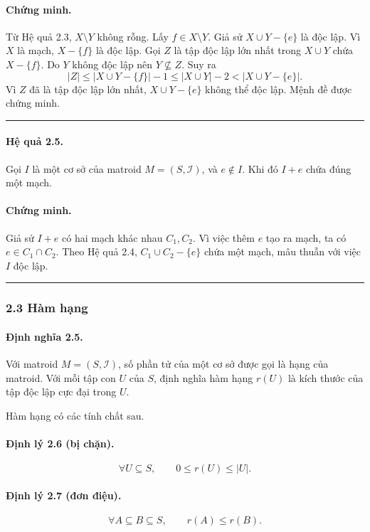 \documentclass[11pt]{article}
\newcommand{\qedmark}{\hfill\rule{0.7ex}{0.7ex}}
\begin{document}
\paragraph{Chứng minh.}
Từ Hệ quả 2.3, \(X\setminus Y\) không rỗng. Lấy \(f\in X\setminus Y\). Giả sử
\(X\cup Y-\{e\}\) là độc lập. Vì \(X\) là mạch, \(X-\{f\}\) là độc lập. Gọi
\(Z\) là tập độc lập lớn nhất trong \(X\cup Y\) chứa \(X-\{f\}\). Do \(Y\) không
độc lập nên \(Y\not\subseteq Z\). Suy ra
\[
  |Z|\le |X\cup Y-\{f\}|-1\le |X\cup Y|-2<|X\cup Y-\{e\}|.
\]
Vì \(Z\) đã là tập độc lập lớn nhất, \(X\cup Y-\{e\}\) không thể độc lập. Mệnh
đề được chứng minh. \qedmark

\paragraph{Hệ quả 2.5.}
Gọi \(I\) là một cơ sở của matroid \(M=(S,\mathcal I)\), và \(e\notin I\). Khi
đó \(I+e\) chứa đúng một mạch.

\paragraph{Chứng minh.}
Giả sử \(I+e\) có hai mạch khác nhau \(C_1,C_2\). Vì việc thêm \(e\) tạo ra
mạch, ta có \(e\in C_1\cap C_2\). Theo Hệ quả 2.4,
\(C_1\cup C_2-\{e\}\) chứa một mạch, mâu thuẫn với việc \(I\) độc lập. \qedmark

\subsubsection*{2.3 Hàm hạng}

\paragraph{Định nghĩa 2.5.}
Với matroid \(M=(S,\mathcal I)\), số phần tử của một cơ sở được gọi là hạng của
matroid. Với mỗi tập con \(U\) của \(S\), định nghĩa hàm hạng \(r(U)\) là kích
thước của tập độc lập cực đại trong \(U\).

Hàm hạng có các tính chất sau.

\paragraph{Định lý 2.6 (bị chặn).}
\[
  \forall U\subseteq S,\qquad 0\le r(U)\le |U|.
\]

\paragraph{Định lý 2.7 (đơn điệu).}
\[
  \forall A\subseteq B\subseteq S,\qquad r(A)\le r(B).
\]
\end{document}
